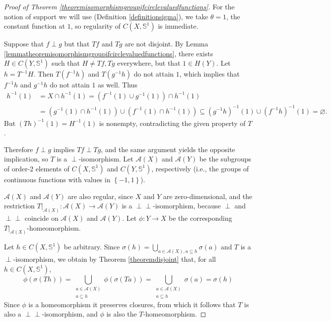 \documentclass[letter,11pt]{amsart}
\theoremstyle{plain}		\newtheorem{theorem}[generalnumbering]{Theorem}
\theoremstyle{plain}		\newtheorem{corollary}[generalnumbering]{Corollary}
\theoremstyle{definition}		\newtheorem{definition}[generalnumbering]{Definition}
\theoremstyle{definition}		\newtheorem{example}[generalnumbering]{Example}
\theoremstyle{plain}		\newtheorem{proposition}[generalnumbering]{Proposition}
\theoremstyle{plain}		\newtheorem{lemma}[generalnumbering]{Lemma}
\theoremstyle{definition}
\newcommand{\perpp}{\perp\!\!\!\perp}
\begin{document}
\begin{proof}[Proof of Theorem \ref{theoremisomorphismgroupifcirclevaluedfunctions}]
	For the notion of support we will use (Definition \ref{definitionsigma}), we take $\theta=1$, the constant function at $1$, so regularity of $C(X,\mathbb{S}^1)$ is immediate. 
	
	Suppose that $f\perp g$ but that $Tf$ and $Tg$ are not disjoint. By Lemma \ref{lemmatheoremisomorphismgroupifcirclevaluedfunctions}, there exists $H\in C(Y,\mathbb{S}^1)$ such that $H\neq Tf,Tg$ everywhere, but that $1\in H(Y)$. Let $h=T^{-1}H$. Then $T(f^{-1}h)$ and $T(g^{-1}h)$ do not attain $1$, which implies that $f^{-1}h$ and $g^{-1}h$ do not attain $1$ as well. Thus
	\begin{align*}
	h^{-1}(1)&=X\cap h^{-1}(1)=(f^{-1}(1)\cup g^{-1}(1))\cap h^{-1}(1)\\
	&=(g^{-1}(1)\cap h^{-1}(1))\cup(f^{-1}(1)\cap h^{-1}(1))\subseteq (g^{-1}h)^{-1}(1)\cup (f^{-1}h)^{-1}(1)=\varnothing.
	\end{align*}
	But $(Th)^{-1}(1)=H^{-1}(1)$ is nonempty, contradicting the given property of $T$.
	
	Therefore $f\perp g$ implies $Tf\perp Tg$, and the same argument yields the opposite implication, so $T$ is a $\perp$-isomorphism. Let $\mathcal{A}(X)$ and $\mathcal{A}(Y)$ be the subgroups of order-$2$ elements of $C(X,\mathbb{S}^1)$ and $C(Y,\mathbb{S}^1)$, respectively (i.e., the groups of continuous functions with values in $\left\{-1,1\right\}$).
	
	$\mathcal{A}(X)$ and $\mathcal{A}(Y)$ are also regular, since $X$ and $Y$ are zero-dimensional, and the restriction $T|_{\mathcal{A}(X)}\colon\mathcal{A}(X)\to \mathcal{A}(Y)$ is a $\perpp$-isomorphism, because $\perp$ and $\perpp$ coincide on $\mathcal{A}(X)$ and $\mathcal{A}(Y)$. Let $\phi\colon Y\to X$ be the corresponding $T|_{\mathcal{A}(X)}$-homeomorphism. 
	
	Let $h\in C(X,\mathbb{S}^1)$ be arbitrary. Since $\sigma(h)=\bigcup_{a\in \mathcal{A}(X),a\subseteq h}\sigma(a)$ and $T$ is a $\perp$-isomorphism, we obtain by Theorem \ref{theoremdisjoint} that, for all $h\in C(X,\mathbb{S}^1)$,
	\[\phi(\sigma(Th))=\bigcup_{\substack{a\in \mathcal{A}(X)\\a\subseteq h}}\phi(\sigma(Ta))=\bigcup_{\substack{a\in \mathcal{A}(X)\\a\subseteq h}}\sigma(a)=\sigma(h)\]
	Since $\phi$ is a homeomorphism it preserves closures, from which it follows that $T$ is also a $\perpp$-isomorphism, and $\phi$ is also the $T$-homeomorphism.
	

\end{proof}
\end{document}
